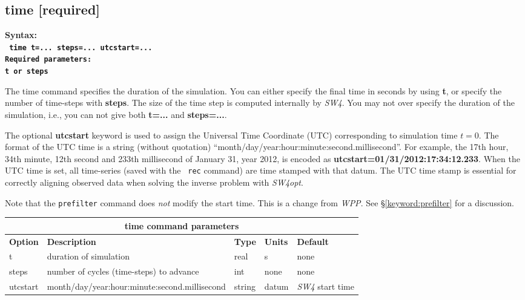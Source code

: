 \documentclass[11pt]{report}
\begin{document}
{\subsection{time [required]}
\begin{flushleft}
	\bf Syntax:\\
	\tt
	time t=... steps=... utcstart=...\\
	\bf Required parameters:\\
	\tt t \rm or \tt steps
\end{flushleft}
The time command specifies the duration of the simulation. You can either specify the final time in
seconds by using {\bf t}, or specify the number of time-steps with {\bf steps}.  The size of the
time step is computed internally by \emph{SW4}. You may not over specify the duration of the
simulation, i.e., you can not give both {\bf t=...} and {\bf steps=...}.

The optional {\bf utcstart} keyword is used to assign the Universal Time Coordinate (UTC)
corresponding to simulation time $t=0$. The format of the UTC time is a string (without quotation)
``month/day/year:hour:minute:second.millisecond''. For example, the 17th hour, 34th minute, 12th
second and 233th millisecond of January 31, year 2012, is encoded as {\bf
		utcstart=01/31/2012:17:34:12.233}. When the UTC time is set, all time-series (saved with the {\tt
		rec} command) are time stamped with that datum. The UTC time stamp is essential for correctly
aligning observed data when solving the inverse problem with \emph{SW4opt}.

Note that the \verb+prefilter+ command does {\it not} modify the start time. This is a change from
\emph{WPP}. See \S\ref{keyword:prefilter} for a discussion.
%
\begin{center}
	\begin{tabular}{|l|p{8cm}|l|l|l|} \hline
		\multicolumn{5}{|c|}{\bf time command parameters}                                                                 \\ \hline
		{\bf Option} & {\bf Description}                             & {\bf Type} & {\bf Units} & {\bf Default}           \\ \hline \hline
		t            & duration of simulation                        & real       & s           & none                    \\ \hline
		steps        & number of cycles (time-steps) to advance      & int        & none        & none                    \\ \hline
		utcstart     & month/day/year:hour:minute:second.millisecond & string     & datum       & {\emph{SW4} start time} \\ \hline
	\end{tabular}
\end{center}

}
\end{document}
